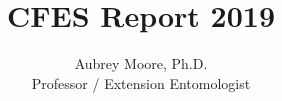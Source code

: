 %



\usepackage[breaklinks=true, colorlinks=True, allcolors=blue]{hyperref}

\usepackage{indentfirst} 
\usepackage{comment}

\newcommand{\activities}{\medskip\textbf{Activities}}
\newcommand{\plans}{\medskip\textbf{Plans}}

\makeatletter

\makeatother




\title{CFES Report 2019}

\author{Aubrey Moore, Ph.D.\\
Professor / Extension Entomologist}

\maketitle



\setcounter{tocdepth}{2}
\tableofcontents{}

\clearpage

